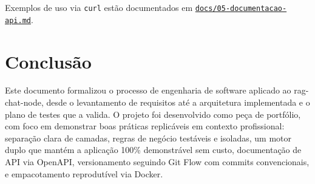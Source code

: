 \documentclass[11pt,a4paper]{article}
\begin{document}
Exemplos de uso via \texttt{curl} estão documentados em
\href{run:../docs/05-documentacao-api.md}{\texttt{docs/05-documentacao-api.md}}.

\section{Conclusão}

Este documento formalizou o processo de engenharia de software aplicado ao
rag-chat-node, desde o levantamento de requisitos até a arquitetura implementada e
o plano de testes que a valida. O projeto foi desenvolvido como peça de portfólio,
com foco em demonstrar boas práticas replicáveis em contexto profissional:
separação clara de camadas, regras de negócio testáveis e isoladas, um motor duplo
que mantém a aplicação 100\% demonstrável sem custo, documentação de API via
OpenAPI, versionamento seguindo Git Flow com commits convencionais, e
empacotamento reprodutível via Docker.
\end{document}
